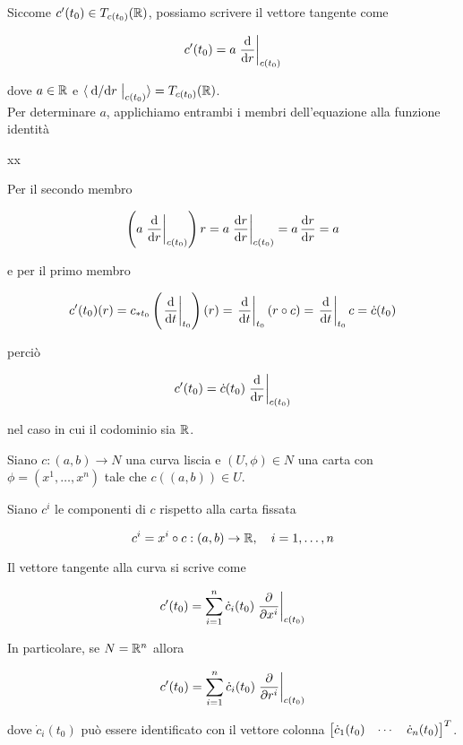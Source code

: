 Siccome $ c'(t_{0}) \in T_{c(t_{0})}(\mathbb{R}) $, possiamo scrivere il vettore tangente come

\begin{equation}
	c'(t_{0}) = a \eval{ \dv{r} }_{c(t_{0})}
\end{equation}

dove $ a \in \mathbb{R} $ e $ \langle \eval{ \dv*{r} }_{c(t_{0})} \rangle = T_{c(t_{0})}(\R) $.\\
Per determinare $ a $, applichiamo entrambi i membri dell'equazione alla funzione identità

	{\R}{\R}
	{x}{x}

Per il secondo membro

\begin{equation}
	\left( a \eval{ \dv{r} }_{c(t_{0})} \right) r = a \eval{ \dv{r}{r} }_{c(t_{0})} %
	= a \, \dv{r}{r} %
	= a
\end{equation}

e per il primo membro

\begin{equation}
	c'(t_{0})(r) = c_{*t_{0}} \left( \eval{ \ddv{t} }_{t_{0}} \right)(r) %
	= \eval{ \ddv{t} }_{t_{0}} (r \circ c) %
	= \eval{ \ddv{t} }_{t_{0}} c %
	= \dot{c}(t_{0})
\end{equation}

perciò

\begin{equation}
	c'(t_{0}) = \dot{c}(t_{0}) \eval{ \dv{r} }_{c(t_{0})}
\end{equation}

nel caso in cui il codominio sia $ \mathbb{R} $.

\begin{definition}\label{loc-exp-tan-cur}
	Siano $ c : (a,b) \to N $ una curva liscia e $ (U,\phi) \in N $ una carta con $ \phi = (x^{1},\dots,x^{n}) $ tale che $ c((a,b)) \in U $.
	
	
	Siano $ c^{i} $ le componenti di $ c $ rispetto alla carta fissata
	
	\begin{equation}
		c^{i} = x^{i} \circ c : (a,b) \to \R \qcomma i=1,\dots,n
	\end{equation}
	
	Il vettore tangente alla curva si scrive come
	
	\begin{equation}
		c'(t_{0}) = \sum_{i=1}^{n} \dot{c}_{i}(t_{0}) \eval{ \pdv{x^{i}} }_{c(t_{0})}
	\end{equation}

	In particolare, se $ N = \mathbb{R}^{n} $ allora
	
	\begin{equation}
		c'(t_{0}) = \sum_{i=1}^{n} \dot{c}_{i}(t_{0}) \eval{ \pdv{r^{i}} }_{c(t_{0})}
	\end{equation}

	dove $ \dot{c}_{i}(t_{0}) $ può essere identificato con il vettore colonna $ \bmqty{ \dot{c}_{1}(t_{0}) & \cdots & \dot{c}_{n}(t_{0}) }^{T} $.
\end{definition}

